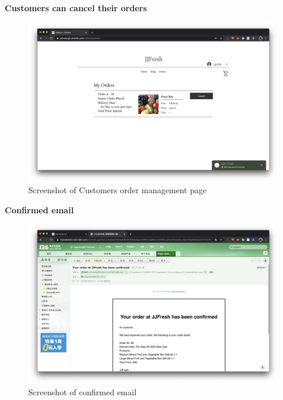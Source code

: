 \documentclass{report}
\begin{document}
\clearpage
\textbf{Customers can cancel their orders}
\begin{figure}[htp]
\centering
\includegraphics[width=\textwidth]{Figures/customerOrder.png}
\caption{Screenshot of Customers order management page}
\label{fig:customerOrder}
\end{figure}

\clearpage
\textbf{Confirmed email}
\begin{figure}[htp]
\centering
\includegraphics[width=\textwidth]{Figures/confirmedEmail.png}
\caption{Screenshot of confirmed email}
\label{fig:confirmedEmail}
\end{figure}
\end{document}
